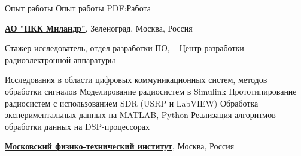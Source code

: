 \documentclass[a4paper, MMyyyy,nonstopmode]{simpleresumecv}
\begin{document}
\begin{Body}












\Section
{Опыт работы}
{Опыт работы}
{PDF:Работа}

\Entry
\href{https://www.milandr.ru/}
{\textbf{АО "ПКК Миландр"}},
Зеленоград, Москва, Россия

\Gap
\BulletItem
Стажер-исследователь,
отдел разработки ПО,
\hfill
{} -- 
\newline
Центр разработки радиоэлектронной аппаратуры
\begin{Detail}
\SubBulletItem
Исследования в области цифровых коммуникационных систем, методов обработки сигналов
\SubBulletItem
Моделирование радиосистем в Simulink
\SubBulletItem
Прототипирование радиосистем с использованием SDR (USRP и LabVIEW)
\SubBulletItem
Обработка экспериментальных данных на MATLAB, Python
\SubBulletItem
Реализация алгоритмов обработки данных на DSP-процессорах
\end{Detail}

\Entry
\href{https://mipt.ru/}
{\textbf{Московский физико-технический институт}},
Москва, Россия


\end{Body}
\end{document}
